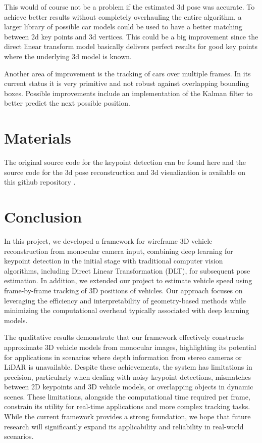 \documentclass[conference]{IEEEtran}
\begin{document}
This would of course not be a problem if the estimated 3d pose was accurate. To achieve better results without completely overhauling the entire algorithm, a larger library of possible car models could be used to have a better matching between 2d key points and 3d vertices. This could be a big improvement since the direct linear transform model basically delivers perfect results for good key points where the underlying 3d model is known.

Another area of improvement is the tracking of cars over multiple frames. In its current status it is very primitive and not robust against overlapping bounding boxes. Possible improvements include an implementation of the Kalman filter to better predict the next possible position.

\section{Materials}

The original source code for the keypoint detection can be found here \cite{keypoints} and the source code for the 3d pose reconstruction and 3d visualization is available on this github repository \cite{keypoint2pose}.

\section{Conclusion}

In this project, we developed a framework for wireframe 3D vehicle reconstruction from monocular camera input, combining deep learning for keypoint detection in the initial stage with traditional computer vision algorithms, including Direct Linear Transformation (DLT), for subsequent pose estimation. In addition, we extended our project to estimate vehicle speed using frame-by-frame tracking of 3D positions of vehicles. Our approach focuses on leveraging the efficiency and interpretability of geometry-based methods while minimizing the computational overhead typically associated with deep learning models.

The qualitative results demonstrate that our framework effectively constructs approximate 3D vehicle models from monocular images, highlighting its potential for applications in scenarios where depth information from stereo cameras or LiDAR is unavailable. Despite these achievements, the system has limitations in precision, particularly when dealing with noisy keypoint detections, mismatches between 2D keypoints and 3D vehicle models, or overlapping objects in dynamic scenes. These limitations, alongside the computational time required per frame, constrain its utility for real-time applications and more complex tracking tasks. While the current framework provides a strong foundation, we hope that future research will significantly expand its applicability and reliability in real-world scenarios.



\end{document}
